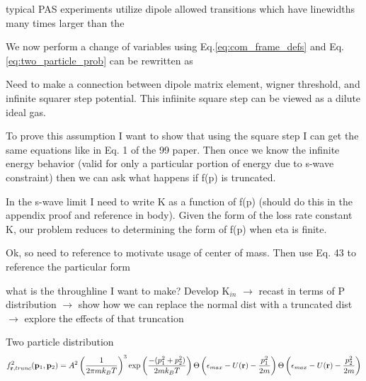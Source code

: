 typical PAS experiments utilize dipole allowed transitions which have linewidths many times larger than the 



We now perform a change of variables using Eq.\ref{eq:com_frame_defs} and Eq.\ref{eq:two_particle_prob} can be rewritten as 




Need to make a connection between dipole matrix element, wigner threshold, and infinite squarer step potential. This infiinite square step can be viewed as a dilute ideal gas. 

To prove this assumption I want to show that using the square step I can get the same equations like in Eq. 1 of the 99 paper. Then once we know the infinite energy behavior (valid for only a particular portion of energy due to s-wave constraint) then we can ask what happens if f(p) is truncated. 

In the s-wave limit I need to write K as a function of f(p) (should do this in the appendix proof and reference in body). Given the form of the loss rate constant K, our problem reduces to determining the form of f(p) when eta is finite.

Ok, so need to reference \cite{Ciuryo2004} to motivate usage of center of mass. Then use \cite{Nicholson2015a} Eq. 43 to reference the particular form 


what is the throughline I want to make? Develop K$_{in}$ $\rightarrow$ recast in terms of P distribution $\rightarrow$ show how we can replace the normal dist with a truncated dist $\rightarrow$ explore the effects of that truncation

Two particle distribution
\begin{equation}
\begin{split}
	f^2_{\mathbf{r},trunc} (\mathbf{p}_1, \mathbf{p}_2) = A^2 \left(\frac{1}{2 \pi m k_B T}\right)^3 \exp \left( \frac{-(p_1^2 + p_2^2)}{2 m k_B T} \right) \Theta \left( {\epsilon_{max} - U(\mathbf{r}) - \frac{p_1^2}{2m}} \right) \Theta \left( {\epsilon_{max} - U(\mathbf{r}) - \frac{p_2^2}{2m}} \right)
\end{split}
\end{equation}